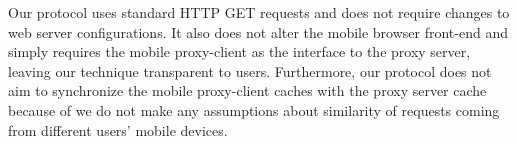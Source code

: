 Our protocol uses standard HTTP GET requests and does not require changes to web server configurations. It also does not alter the mobile browser front-end and simply requires the mobile proxy-client as the interface to the proxy server, leaving our technique transparent to users. Furthermore, our protocol does not aim to synchronize the mobile proxy-client caches with the proxy server cache because of we do not make any assumptions about similarity of requests coming from different users' mobile devices.







